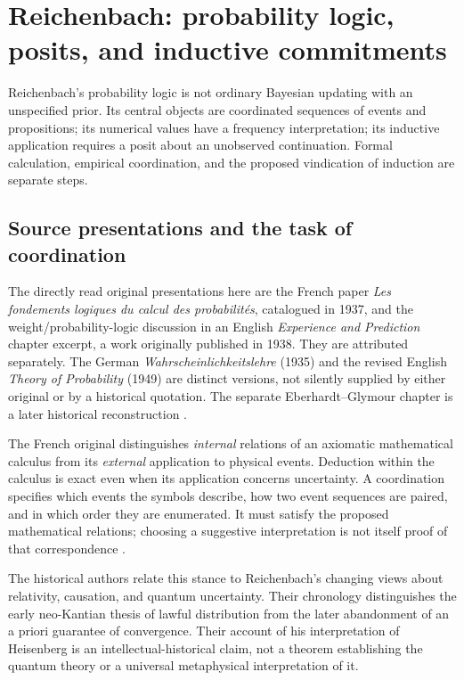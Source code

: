 \chapter{Reichenbach: probability logic, posits, and inductive commitments}
\label{sec:p15-reichenbach-probability-logic}

Reichenbach's probability logic is not ordinary Bayesian updating with
an unspecified prior. Its central objects are coordinated sequences of
events and propositions; its numerical values have a frequency
interpretation; its inductive application requires a posit about an
unobserved continuation. Formal calculation, empirical coordination,
and the proposed vindication of induction are separate steps.

\section{Source presentations and the task of coordination}
\label{sec:p15-reichenbach-presentations}

The directly read original presentations here are the French paper
\emph{Les fondements logiques du calcul des probabilités}, catalogued
in 1937, and the weight/probability-logic discussion in an English
\emph{Experience and Prediction} chapter excerpt, a work originally
published in 1938. They are attributed separately. The German
\emph{Wahrscheinlichkeitslehre} (1935) and the revised English
\emph{Theory of Probability} (1949) are distinct versions, not silently
supplied by either original or by a historical quotation. The separate
Eberhardt--Glymour chapter is a later historical reconstruction
\cite{Reichenbach1937Fondements,Reichenbach1938EPChapterReading,
EberhardtGlymour2011ReichenbachReading}.

The French original distinguishes \emph{internal} relations of an
axiomatic mathematical calculus from its \emph{external} application
to physical events. Deduction within the calculus is exact even when
its application concerns uncertainty. A coordination specifies which
events the symbols describe, how two event sequences are paired, and
in which order they are enumerated. It must satisfy the proposed
mathematical relations; choosing a suggestive interpretation is not
itself proof of that correspondence
\cite[chap.~I; chap.~II, secs.~1--2 and6]{Reichenbach1937Fondements}.

The historical authors relate this stance to Reichenbach's changing
views about relativity, causation, and quantum uncertainty. Their
chronology distinguishes the early neo-Kantian thesis of lawful
distribution from the later abandonment of an a priori guarantee of
convergence. Their account of his interpretation of Heisenberg is an
intellectual-historical claim, not a theorem establishing the quantum
theory or a universal metaphysical interpretation of it.

